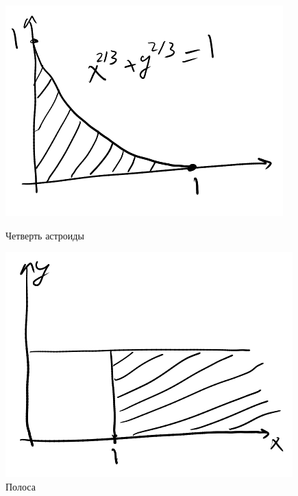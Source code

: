 \documentclass[english]{article}
\theoremstyle{plain}
\theoremstyle{remark}
\theoremstyle{definition}
\begin{document}
\begin{figure}[H]
\centering
\begin{minipage}{20em}
\includegraphics[scale=0.3]{5_6.png}
\caption{Четверть астроиды}
\end{minipage}
\begin{minipage}{20em}
\includegraphics[scale=0.3]{5_8.png}
\caption{Полоса}
\end{minipage}
\end{figure}
\end{document}
